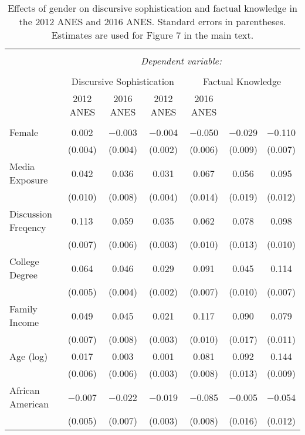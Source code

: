 
\begin{table}[!htbp] \centering 
  \caption{Effects of gender on discursive sophistication and factual knowledge in the
          2012 ANES and 2016 ANES. Standard errors in parentheses. Estimates are used for
          Figure 7 in the main text.} 
  \label{tab:determinants_anes} 
\begin{tabular}{@{\extracolsep{0pt}}lcccccc} 
\\[-1.8ex]\hline 
\hline \\[-1.8ex] 
 & \multicolumn{6}{c}{\textit{Dependent variable:}} \\ 
\cline{2-7} 
\\[-1.8ex] & \multicolumn{3}{c}{Discursive Sophistication} & \multicolumn{3}{c}{Factual Knowledge} \\ 
 & 2012 ANES & 2016 ANES & 2012 ANES & 2016 ANES &  &  \\ 
\hline \\[-1.8ex] 
 Female & 0.002 & $-$0.003 & $-$0.004 & $-$0.050 & $-$0.029 & $-$0.110 \\ 
  & (0.004) & (0.004) & (0.002) & (0.006) & (0.009) & (0.007) \\ 
  Media Exposure & 0.042 & 0.036 & 0.031 & 0.067 & 0.056 & 0.095 \\ 
  & (0.010) & (0.008) & (0.004) & (0.014) & (0.019) & (0.012) \\ 
  Discussion Freqency & 0.113 & 0.059 & 0.035 & 0.062 & 0.078 & 0.098 \\ 
  & (0.007) & (0.006) & (0.003) & (0.010) & (0.013) & (0.010) \\ 
  College Degree & 0.064 & 0.046 & 0.029 & 0.091 & 0.045 & 0.114 \\ 
  & (0.005) & (0.004) & (0.002) & (0.007) & (0.010) & (0.007) \\ 
  Family Income & 0.049 & 0.045 & 0.021 & 0.117 & 0.090 & 0.079 \\ 
  & (0.007) & (0.008) & (0.003) & (0.010) & (0.017) & (0.011) \\ 
  Age (log) & 0.017 & 0.003 & 0.001 & 0.081 & 0.092 & 0.144 \\ 
  & (0.006) & (0.006) & (0.003) & (0.008) & (0.013) & (0.009) \\ 
  African American & $-$0.007 & $-$0.022 & $-$0.019 & $-$0.085 & $-$0.005 & $-$0.054 \\ 
  & (0.005) & (0.007) & (0.003) & (0.008) & (0.016) & (0.012) \\ 

\end{tabular}
\end{table}
